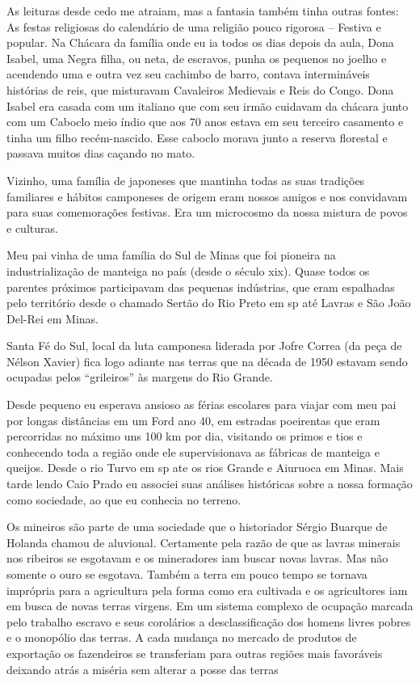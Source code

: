 As leituras desde cedo me atraiam, mas a fantasia também tinha outras
fontes: As festas religiosas do calendário de uma religião pouco
rigorosa -- Festiva e popular. Na Chácara da família onde eu ia todos os
dias depois da aula, Dona Isabel, uma Negra filha, ou neta, de escravos,
punha os pequenos no joelho e acendendo uma e outra vez seu cachimbo de
barro, contava intermináveis histórias de reis, que misturavam
Cavaleiros Medievais e Reis do Congo. Dona Isabel era casada com um
italiano que com seu irmão cuidavam da chácara junto com um Caboclo meio
índio que aos 70 anos estava em seu terceiro casamento e tinha um filho
recém-nascido. Esse caboclo morava junto a reserva florestal e passava
muitos dias caçando no mato.

Vizinho, uma família de japoneses que mantinha todas as suas tradições
familiares e hábitos camponeses de origem eram nossos amigos e nos
convidavam para suas comemorações festivas. Era um microcosmo da nossa
mistura de povos e culturas.

Meu pai vinha de uma família do Sul de Minas que foi pioneira na
industrialização de manteiga no país (desde o século {\sc xix}). Quase todos
os parentes próximos participavam das pequenas indústrias, que eram
espalhadas pelo território desde o chamado Sertão do Rio Preto em {\sc sp} até
Lavras e São João Del-Rei em Minas.

Santa Fé do Sul, local da luta camponesa liderada por Jofre Correa (da
peça de Nélson Xavier) fica logo adiante nas terras que na década de
1950 estavam sendo ocupadas pelos “grileiros” às margens do Rio Grande.

Desde pequeno eu esperava ansioso as férias escolares para viajar com
meu pai por longas distâncias em um Ford ano 40, em estradas poeirentas
que eram percorridas no máximo uns 100 km por dia, visitando os primos e
tios e conhecendo toda a região onde ele supervisionava as fábricas de
manteiga e queijos. Desde o rio Turvo em {\sc sp} ate os rios Grande e
Aiuruoca em Minas. Mais tarde lendo Caio Prado eu associei suas análises
históricas sobre a nossa formação como sociedade, ao que eu conhecia no
terreno.

Os mineiros são parte de uma sociedade que o historiador Sérgio Buarque
de Holanda chamou de aluvional. Certamente pela razão de que as lavras
minerais nos ribeiros se esgotavam e os mineradores iam buscar novas
lavras. Mas não somente o ouro se esgotava. Também a terra em pouco
tempo se tornava imprópria para a agricultura pela forma como era
cultivada e os agricultores iam em busca de novas terras virgens. Em um
sistema complexo de ocupação marcada pelo trabalho escravo e seus
corolários a desclassificação dos homens livres pobres e o monopólio das
terras. A cada mudança no mercado de produtos de exportação os
fazendeiros se transferiam para outras regiões mais favoráveis deixando
atrás a miséria sem alterar a posse das terras

